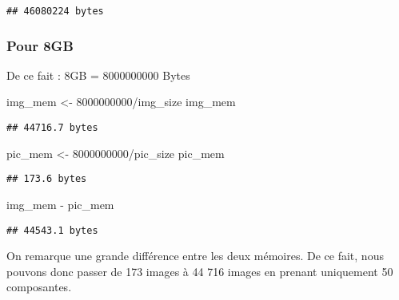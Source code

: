 \documentclass[
]{article}
\newenvironment{Shaded}{\begin{snugshade}}{\end{snugshade}}
\newcommand{\DecValTok}[1]{\textcolor[rgb]{0.00,0.00,0.81}{#1}}
\newcommand{\NormalTok}[1]{#1}
\newcommand{\OtherTok}[1]{\textcolor[rgb]{0.56,0.35,0.01}{#1}}
\newcommand{\SpecialCharTok}[1]{\textcolor[rgb]{0.00,0.00,0.00}{#1}}
\begin{document}
\begin{verbatim}
## 46080224 bytes
\end{verbatim}

\hypertarget{pour-8gb}{%
\subsubsection{Pour 8GB}\label{pour-8gb}}

De ce fait : 8GB = 8000000000 Bytes

\begin{Shaded}
\begin{Highlighting}[]
\NormalTok{img\_mem }\OtherTok{\textless{}{-}} \DecValTok{8000000000}\SpecialCharTok{/}\NormalTok{img\_size}
\NormalTok{img\_mem}
\end{Highlighting}
\end{Shaded}

\begin{verbatim}
## 44716.7 bytes
\end{verbatim}

\begin{Shaded}
\begin{Highlighting}[]
\NormalTok{pic\_mem }\OtherTok{\textless{}{-}} \DecValTok{8000000000}\SpecialCharTok{/}\NormalTok{pic\_size}
\NormalTok{pic\_mem}
\end{Highlighting}
\end{Shaded}

\begin{verbatim}
## 173.6 bytes
\end{verbatim}

\begin{Shaded}
\begin{Highlighting}[]
\NormalTok{img\_mem }\SpecialCharTok{{-}}\NormalTok{ pic\_mem}
\end{Highlighting}
\end{Shaded}

\begin{verbatim}
## 44543.1 bytes
\end{verbatim}

On remarque une grande différence entre les deux mémoires. De ce fait,
nous pouvons donc passer de 173 images à 44 716 images en prenant
uniquement 50 composantes.
\end{document}

